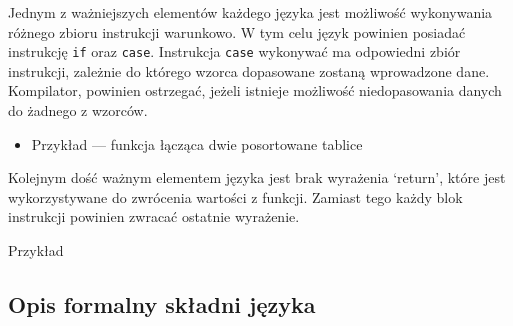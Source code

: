\documentclass{article}
\begin{document}

\newpage



Jednym z ważniejszych elementów każdego języka jest możliwość wykonywania różnego zbioru instrukcji warunkowo. W tym celu język powinien posiadać instrukcję \lstinline$if$ oraz \lstinline$case$. Instrukcja \lstinline$case$ wykonywać ma odpowiedni zbiór instrukcji, zależnie do którego wzorca dopasowane zostaną wprowadzone dane. Kompilator, powinien ostrzegać, jeżeli istnieje możliwość niedopasowania danych do żadnego z wzorców.

\begin{itemize}

  \item Przykład --- funkcja łącząca dwie posortowane tablice
        \newpage
        
\end{itemize}


Kolejnym dość ważnym elementem języka jest brak wyrażenia `return', które jest wykorzystywane do zwrócenia wartości z funkcji. Zamiast tego każdy blok instrukcji powinien zwracać ostatnie wyrażenie.

\newpage
Przykład



\newpage
\subsection{Opis formalny składni języka}
\end{document}
